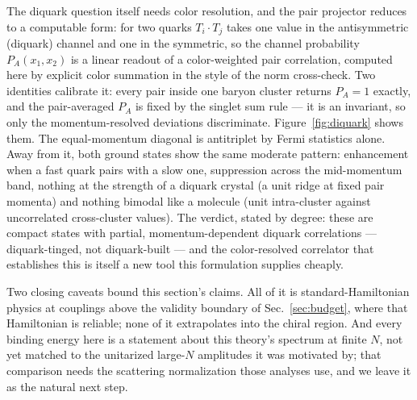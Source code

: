 The diquark question itself needs color resolution, and the
pair projector reduces to a computable form: for two quarks
$T_i\cdot T_j$ takes one value in the antisymmetric (diquark) channel and
one in the symmetric, so the channel probability $P_A(x_1,x_2)$ is a
linear readout of a color-weighted pair correlation, computed here by
explicit color summation in the style of the norm cross-check.  Two
identities calibrate it: every pair inside one baryon cluster returns
$P_A = 1$ exactly, and the pair-averaged $P_A$ is fixed by the singlet
sum rule --- it is an invariant, so only the momentum-resolved deviations
discriminate.  Figure~\ref{fig:diquark} shows them.  The equal-momentum
diagonal is antitriplet by Fermi statistics alone.  Away from it, both
ground states show the same moderate pattern: enhancement when a fast
quark pairs with a slow one, suppression across the mid-momentum band,
nothing at the strength of a diquark crystal (a unit ridge at fixed pair
momenta) and nothing bimodal like a molecule (unit intra-cluster against
uncorrelated cross-cluster values).  The verdict, stated by degree: these
are compact states with partial, momentum-dependent diquark correlations
--- diquark-tinged, not diquark-built --- and the color-resolved
correlator that establishes this is itself a new tool this formulation
supplies cheaply.

Two closing caveats bound this section's claims.  All of it is
standard-Hamiltonian physics at couplings above the validity boundary of
Sec.~\ref{sec:budget}, where that Hamiltonian is reliable; none of it
extrapolates into the chiral region.  And every binding energy here is a
statement about this theory's spectrum at finite $N$, not yet matched to
the unitarized large-$N$ amplitudes it was motivated by; that comparison
needs the scattering normalization those analyses use, and we leave it as
the natural next step.

